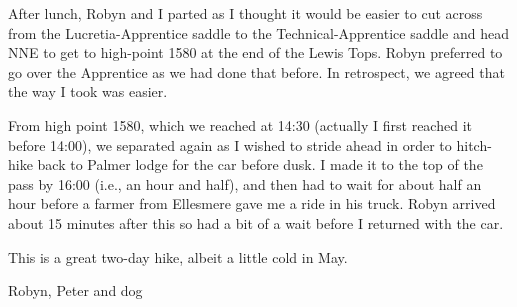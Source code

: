 \documentclass[12pt]{article} %
\begin{document}
After lunch, Robyn and I parted as I thought it would be easier to cut across from the Lucretia-Apprentice saddle to the Technical-Apprentice saddle and head NNE to get to high-point 1580 at the end of the Lewis Tops.  Robyn preferred to go over the Apprentice as we had done that before.  In retrospect, we agreed that the way I took was easier.

From high point 1580, which we reached at 14:30 (actually I first reached it before 14:00), we separated again as I wished to stride ahead in order to hitch-hike back to Palmer lodge for the car before dusk.  I made it to the top of the pass by 16:00 (i.e., an hour and half), and then had to wait for about half an hour before a farmer from Ellesmere gave me a ride in his truck.  Robyn arrived about 15 minutes after this so had a bit of a wait before I returned with the car.

This is a great two-day hike, albeit a little cold in May.

\begin{flushright}
Robyn, Peter and dog
\end{flushright}
\end{document}

